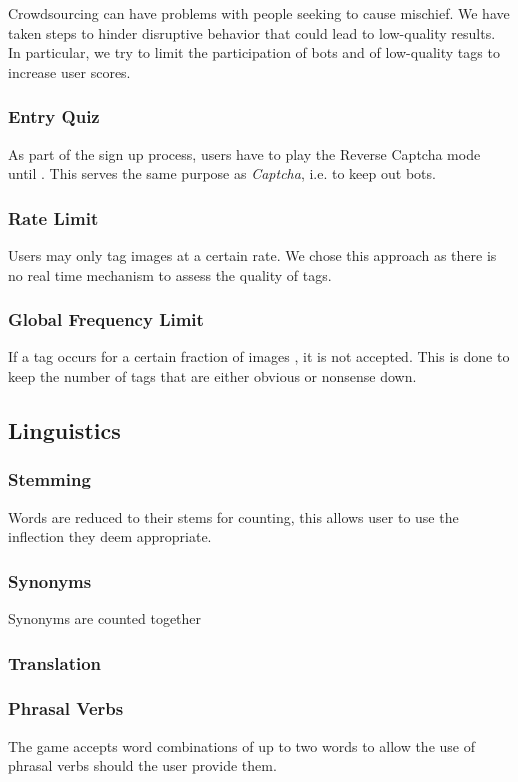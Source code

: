 Crowdsourcing can have problems with people seeking to cause mischief. We have taken steps to hinder disruptive behavior that could lead to low-quality results. In particular, we try to limit the participation of bots and  of low-quality tags to increase user scores.


\subsubsection{Entry Quiz}

As part of the sign up process, users have to play the Reverse Captcha mode until . This serves the same purpose as \textit{Captcha}, i.e. to keep out bots.


\subsubsection{Rate Limit}
Users may only tag images at a certain rate. We chose this approach as there is no real time mechanism to assess the quality of tags.

\subsubsection{Global Frequency Limit}
If a tag occurs for a certain fraction of images , it is not accepted. This is done to keep the number of tags that are either obvious or nonsense down.




\subsection{Linguistics}




\subsubsection{Stemming}
Words are reduced to their stems for counting, this allows user to use the inflection they deem appropriate.


\subsubsection{Synonyms}
Synonyms are counted together


\subsubsection{Translation}



\subsubsection{Phrasal Verbs}
The game accepts word combinations of up to two words to allow the use of phrasal verbs should the user provide them.


